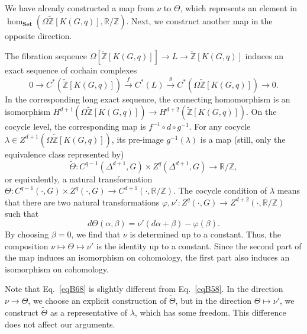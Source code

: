 \documentclass[reprint, amsmath, amssymb, showpacs, floatfix, longbibliography, aps, twocolumn, superscriptaddress, nofootinbib]{revtex4-2}
\newcommand{\ZZ}{{\mathbb Z}}
\newcommand{\RR}{{\mathbb R}}
\newcommand{\tZ}{{\widetilde{\mathbb Z}}}
\theoremstyle{definition}
\begin{document}
 
We have already constructed a map from $\nu$ to $\Theta$, which represents an element in $\hom_{\mathbf{Set}}(\Omega\tZ[K(G,q)],\RR/\ZZ)$. Next, we construct another map in the opposite direction.




The fibration sequence $\Omega[\tZ[K(G,q)]]\rightarrow L\rightarrow\tZ[K(G,q)]$ induces an exact sequence of cochain complexes
\begin{equation}
	0	\rightarrow C^*(\tZ[K(G,q)])\xrightarrow{f} C^*(L)\xrightarrow{g} C^*(\Omega\tZ[K(G,q)])\rightarrow0.
\end{equation}
In the corresponding long exact sequence, the connecting homomorphism is an isomorphism $H^{d+1}(\Omega\tZ[K(G,q)])\rightarrow H^{d+2}(\tZ[K(G,q)])$. On the cocycle level, the corresponding map is $f^{-1}\circ d\circ g^{-1}$. For any cocycle $\lambda \in Z^{d+1}(\Omega\tZ[K(G,q)])$, its pre-image $g^{-1}(\lambda)$ is a map (still, only the equivalence class represented by)
\begin{equation}
	\tilde\Theta: C^{q-1}(\Delta^{d+1},G)\times Z^{q}(\Delta^{d+1},G)\rightarrow \RR/\ZZ,
\end{equation}
or equivalently, a natural transformation $\Theta:C^{q-1}(\cdot,G)\times Z^{q}(\cdot,G)\rightarrow C^{d+1}(\cdot, \RR/\ZZ)$.
 The cocycle condition of $\lambda$ means that there are two natural transformations $\varphi,\nu':Z^q(\cdot,G)\rightarrow Z^{d+2}(\cdot,\RR/\ZZ)$ such that
\begin{equation}\label{eqB68}
	d\Theta(\alpha,\beta)=\nu'(d\alpha+\beta)-\varphi(\beta).
\end{equation}
By choosing $\beta=0$, we find that $\nu$ is determined up to a constant. Thus, the composition $\nu\mapsto \Theta\mapsto \nu'$ is the identity up to a constant. Since the second part of the map induces an isomorphism on cohomology, the first part also induces an isomorphism on cohomology.

Note that Eq.~\eqref{eqB68} is slightly different from Eq.~\eqref{eqB58}. In the direction $\nu\rightarrow \Theta$, we choose an explicit construction of $\tilde{\Theta}$, but in the direction $\Theta\mapsto \nu'$, we construct $\tilde\Theta$ as a representative of $\lambda$, which has some freedom. This difference does not affect our arguments.
\end{document}
